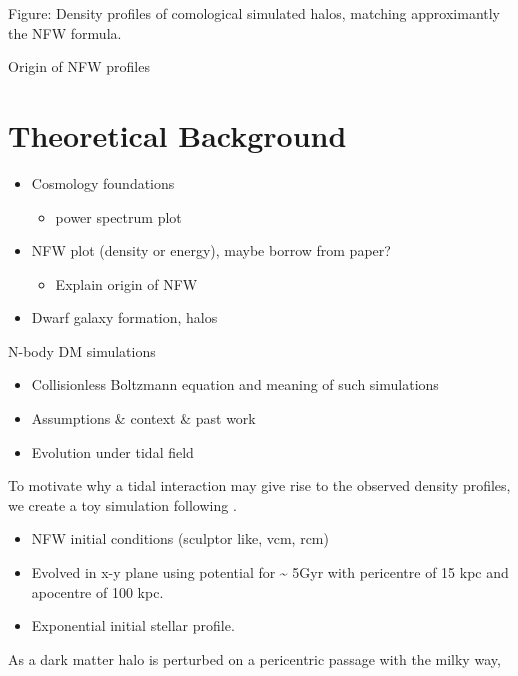 Figure: Density profiles of comological simulated halos, matching
approximantly the NFW formula.

Origin of NFW profiles

\section{Theoretical Background}\label{theoretical-background}

\begin{itemize}
\tightlist
\item
  Cosmology foundations

  \begin{itemize}
  \tightlist
  \item
    power spectrum plot
  \end{itemize}
\item
  NFW plot (density or energy), maybe borrow from paper?

  \begin{itemize}
  \tightlist
  \item
    Explain origin of NFW
  \end{itemize}
\item
  Dwarf galaxy formation, halos
\end{itemize}

N-body DM simulations

\begin{itemize}
\tightlist
\item
  Collisionless Boltzmann equation and meaning of such simulations
\item
  Assumptions \& context \& past work
\item
  Evolution under tidal field
\end{itemize}

To motivate why a tidal interaction may give rise to the observed
density profiles, we create a toy simulation following \citet{PNM2008}.

\begin{itemize}
\item
  NFW initial conditions (sculptor like, vcm, rcm)
\item
  Evolved in x-y plane using \citet{EP2020} potential for
  \textasciitilde{} 5Gyr with pericentre of 15 kpc and apocentre of 100
  kpc.
\item
  Exponential initial stellar profile.
\end{itemize}

As a dark matter halo is perturbed on a pericentric passage with the
milky way,

